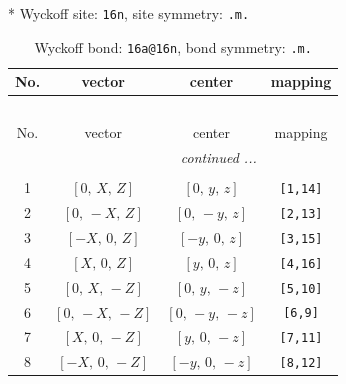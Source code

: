 \documentclass[fleqn,8pt]{jsarticle}
\begin{document}
* Wyckoff site: {\tt 16n}, site symmetry: {\tt .m.}
\renewcommand{\arraystretch}{1.2}
\begin{longtable}{cccc}
\caption{Wyckoff bond: {\tt 16a@16n}, bond symmetry: {\tt .m.}}
 \\
 \hline \hline
No. & vector & center & mapping \\ \hline \endfirsthead

\multicolumn{3}{l}{\tablename\ \thetable{}} \\
 \hline \hline
No. & vector & center & mapping \\ \hline \endhead

 \hline \hline
\multicolumn{3}{r}{\footnotesize\it continued ...} \\ \endfoot

 \hline \hline
\multicolumn{3}{r}{} \\ \endlastfoot

1 & $\left[ 0,\, X,\, Z \right]$ & $\left[ 0,\, y,\, z \right]$ & {\tt [1,14]} \\ \hline
2 & $\left[ 0,\, - X,\, Z \right]$ & $\left[ 0,\, - y,\, z \right]$ & {\tt [2,13]} \\ \hline
3 & $\left[ - X,\, 0,\, Z \right]$ & $\left[ - y,\, 0,\, z \right]$ & {\tt [3,15]} \\ \hline
4 & $\left[ X,\, 0,\, Z \right]$ & $\left[ y,\, 0,\, z \right]$ & {\tt [4,16]} \\ \hline
5 & $\left[ 0,\, X,\, - Z \right]$ & $\left[ 0,\, y,\, - z \right]$ & {\tt [5,10]} \\ \hline
6 & $\left[ 0,\, - X,\, - Z \right]$ & $\left[ 0,\, - y,\, - z \right]$ & {\tt [6,9]} \\ \hline
7 & $\left[ X,\, 0,\, - Z \right]$ & $\left[ y,\, 0,\, - z \right]$ & {\tt [7,11]} \\ \hline
8 & $\left[ - X,\, 0,\, - Z \right]$ & $\left[ - y,\, 0,\, - z \right]$ & {\tt [8,12]} \\
\end{longtable}
\renewcommand{\arraystretch}{1.2}
\end{document}
